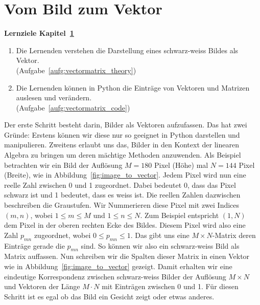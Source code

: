 \section{Vom Bild zum Vektor} \label{sec:vectormatrix}
\begin{tcolorbox}
	\centerline{\textbf{Lernziele Kapitel~\ref{sec:vectormatrix}}}
	\begin{enumerate}[leftmargin=*,label=\thesection.\arabic*]
		\item \label{item:vectormatrix_theory} Die Lernenden verstehen die Darstellung eines schwarz-weiss Bildes als Vektor.\\
		(Aufgabe~\ref{aufg:vectormatrix_theory})
		\item \label{item:vectormatrix_code} Die Lernenden können in Python die Einträge von Vektoren und Matrizen auslesen und verändern.\\
		(Aufgabe~\ref{aufg:vectormatrix_code})
	\end{enumerate}
\end{tcolorbox}
Der erste Schritt besteht darin, Bilder als Vektoren aufzufassen.
Das hat zwei Gründe: Erstens können wir diese nur so geeignet in Python darstellen und manipulieren.
Zweitens erlaubt uns das, Bilder in den Kontext der linearen Algebra zu bringen um deren mächtige Methoden anzuwenden.
Als Beispiel betrachten wir ein Bild der Auflösung $M=180$ Pixel (Höhe) mal $N=144$ Pixel (Breite), wie in Abbildung~\ref{fig:image_to_vector}.
Jedem Pixel wird nun eine reelle Zahl zwischen 0 und 1 zugeordnet.
Dabei bedeutet 0, dass das Pixel schwarz ist und 1 bedeutet, dass es weiss ist.
Die reellen Zahlen dazwischen beschreiben die Graustufen.
Wir Nummerieren diese Pixel mit zwei Indices $\left(m,n\right)$, wobei $1\leq m\leq M$ und $1\leq n\leq N$.
Zum Beispiel entspricht $\left(1,N\right)$ dem Pixel in der oberen rechten Ecke des Bildes.
Diesem Pixel wird also eine Zahl $p_{mn}$ zugeordnet, wobei $0\leq p_{mn}\leq 1$.
Das gibt uns eine $M\times N$-Matrix deren Einträge gerade die $p_{mn}$ sind.
So können wir also ein schwarz-weiss Bild als Matrix auffassen.
Nun schreiben wir die Spalten dieser Matrix in einen Vektor wie in Abbildung~\ref{fig:image_to_vector} gezeigt.
Damit erhalten wir eine eindeutige Korrespondenz zwischen schwarz-weiss Bilder der Auflösung $M\times N$ und Vektoren der Länge $M\cdot N$ mit Einträgen zwischen 0 und 1.
Für diesen Schritt ist es egal ob das Bild ein Gesicht zeigt oder etwas anderes.
